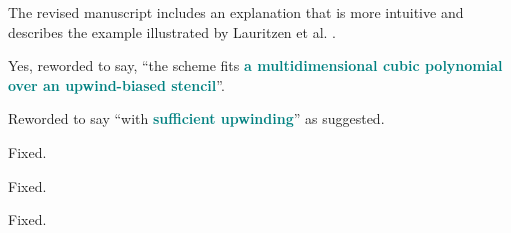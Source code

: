 \documentclass[times]{elsarticle}
\newcommand{\revtwo}[1]{\textcolor{teal}{\textbf{#1}}}
\begin{document}
\begin{quotation}
\begin{comment}
\item P2, 5 lines from the bottom: `...non-simply connected domains...'. I found this
phrase confusing.
\end{comment}
\end{quotation}
The revised manuscript includes an explanation that is more intuitive and describes the example illustrated by Lauritzen et al. \citep{lauritzen2011}.

\begin{quotation}
\begin{comment}
\item P3 line 17: `cubic, upwind-biased stencil'. Surely it is the polynomial that is
cubic, rather than the stencil?
\end{comment}
\end{quotation}
Yes, reworded to say, ``the scheme fits \revtwo{a multidimensional cubic polynomial over an upwind-biased stencil}''.

\begin{quotation}
\begin{comment}
\item P3 below (2): `stable ... with some upwinding'. Presumably some qualification is required
(with sufficient upwinding)?
\end{comment}
\end{quotation}
Reworded to say ``with \revtwo{sufficient upwinding}'' as suggested.

\begin{quotation}
\begin{comment}
\item P5 footnote: could be made
\end{comment}
\end{quotation}
Fixed.

\begin{quotation}
\begin{comment}
\item P14 5 lines from the bottom: cubic should be cubicFit?
\end{comment}
\end{quotation}
Fixed.

\begin{quotation}
\begin{comment}
\item P18 2 lines from the bottom: imprinting in
\end{comment}
\end{quotation}
Fixed.
\end{document}
